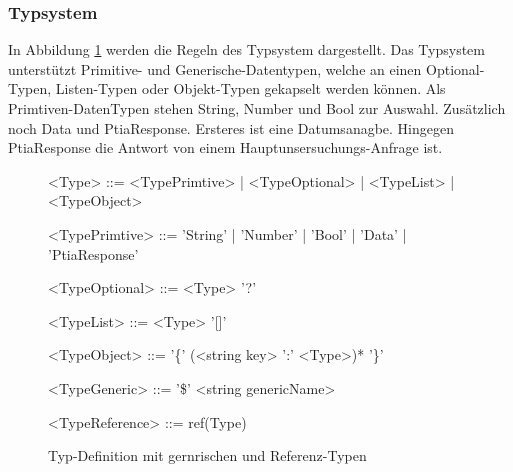 \documentclass{article}
\begin{document}
    \subsubsection{Typsystem}
    In Abbildung \ref{Typsystem} werden die Regeln des Typsystem dargestellt.
    Das Typsystem unterstützt Primitive- und Generische-Datentypen, welche an einen Optional-Typen, Listen-Typen oder Objekt-Typen gekapselt werden können.
    Als Primtiven-DatenTypen stehen String, Number und Bool zur Auswahl. Zusätzlich noch Data und PtiaResponse. 
    Ersteres ist eine Datumsanagbe. Hingegen PtiaResponse die Antwort von einem Hauptunsersuchungs-Anfrage ist.\\
    \begin{figure}
        \begin{grammar}
            <Type> ::= <TypePrimtive> | <TypeOptional> | <TypeList> | <TypeObject>

            <TypePrimtive> ::= 'String' | 'Number' | 'Bool' | 'Data' | 'PtiaResponse'
            
            <TypeOptional> ::= <Type> '?'
            
            <TypeList> ::= <Type> '[]'
            
            <TypeObject> ::= '\{' (<string key> ':' <Type>)* '\}'

            <TypeGeneric> ::= '\$' <string genericName>

            <TypeReference> ::= ref(Type)
        \end{grammar}
        \caption{Typ-Definition mit gernrischen und Referenz-Typen}
        \label{Typsystem}
    \end{figure}
\end{document}
